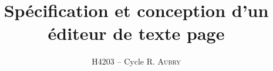 


\title{Spécification et conception d'un éditeur de texte page}
\author{H4203 -- Cycle R. \textsc{Aubry}}



\maketitle
{\footnotesize
\tableofcontents}
\newpage


\newpage


\newpage




